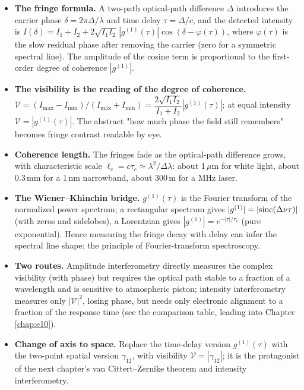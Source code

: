 \begin{itemize}
  \item \textbf{The fringe formula.} A two-path optical-path difference \(\Delta\) introduces the carrier phase \(\delta=2\pi\Delta/\lambda\) and time delay \(\tau=\Delta/c\), and the detected intensity is \(I(\delta)=I_1+I_2+2\sqrt{I_1I_2}\,|g^{(1)}(\tau)|\cos(\delta-\varphi(\tau))\), where \(\varphi(\tau)\) is the slow residual phase after removing the carrier (zero for a symmetric spectral line). The amplitude of the cosine term is proportional to the first-order degree of coherence \(|g^{(1)}|\).
  \item \textbf{The visibility is the reading of the degree of coherence.} \(\mathcal V=(I_{\max}-I_{\min})/(I_{\max}+I_{\min})=\dfrac{2\sqrt{I_1I_2}}{I_1+I_2}|g^{(1)}(\tau)|\); at equal intensity \(\mathcal V=|g^{(1)}(\tau)|\). The abstract "how much phase the field still remembers" becomes fringe contrast readable by eye.
  \item \textbf{Coherence length.} The fringes fade as the optical-path difference grows, with characteristic scale \(\ell_c=c\tau_c\simeq\lambda^2/\Delta\lambda\): about 1\,\(\mu\)m for white light, about 0.3\,mm for a 1\,nm narrowband, about 300\,m for a MHz laser.
  \item \textbf{The Wiener--Khinchin bridge.} \(g^{(1)}(\tau)\) is the Fourier transform of the normalized power spectrum; a rectangular spectrum gives \(|g^{(1)}|=|{\rm sinc}(\Delta\nu\tau)|\) (with zeros and sidelobes), a Lorentzian gives \(|g^{(1)}|=e^{-|\tau|/\tau_c}\) (pure exponential). Hence measuring the fringe decay with delay can infer the spectral line shape: the principle of Fourier-transform spectroscopy.
  \item \textbf{Two routes.} Amplitude interferometry directly measures the complex visibility (with phase) but requires the optical path stable to a fraction of a wavelength and is sensitive to atmospheric piston; intensity interferometry measures only \(|\mathcal V|^2\), losing phase, but needs only electronic alignment to a fraction of the response time (see the comparison table, leading into Chapter \ref{chap:e10}).
  \item \textbf{Change of axis to space.} Replace the time-delay version \(g^{(1)}(\tau)\) with the two-point spatial version \(\gamma_{12}\), with visibility \(\mathcal V=|\gamma_{12}|\); it is the protagonist of the next chapter's van Cittert--Zernike theorem and intensity interferometry.
\end{itemize}

